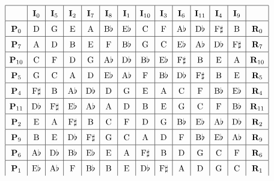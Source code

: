 \documentclass{article}
\begin{document}
\[\def\arraystretch{1.5}
\begin{array}{|c|c|c|c|c|c|c|c|c|c|c|c|c|c|}
\hline
&\mathbf{I}_0&\mathbf{I}_5&\mathbf{I}_2&\mathbf{I}_7&\mathbf{I}_8&\mathbf{I}_1&\mathbf{I}_{10}&\mathbf{I}_3&\mathbf{I}_6&\mathbf{I}_{11}&\mathbf{I}_4&\mathbf{I}_9&\\
\hline
\mathbf{P}_0&\mathrm{D}&\mathrm{G}&\mathrm{E}&\mathrm{A}&\mathrm{B}\flat&\mathrm{E}\flat&\mathrm{C}&\mathrm{F}&\mathrm{A}\flat&\mathrm{D}\flat&\mathrm{F}\sharp&\mathrm{B}&\mathbf{R}_0\\
\hline
\mathbf{P}_7&\mathrm{A}&\mathrm{D}&\mathrm{B}&\mathrm{E}&\mathrm{F}&\mathrm{B}\flat&\mathrm{G}&\mathrm{C}&\mathrm{E}\flat&\mathrm{A}\flat&\mathrm{D}\flat&\mathrm{F}\sharp&\mathbf{R}_7\\
\hline
\mathbf{P}_{10}&\mathrm{C}&\mathrm{F}&\mathrm{D}&\mathrm{G}&\mathrm{A}\flat&\mathrm{D}\flat&\mathrm{B}\flat&\mathrm{E}\flat&\mathrm{F}\sharp&\mathrm{B}&\mathrm{E}&\mathrm{A}&\mathbf{R}_{10}\\
\hline
\mathbf{P}_5&\mathrm{G}&\mathrm{C}&\mathrm{A}&\mathrm{D}&\mathrm{E}\flat&\mathrm{A}\flat&\mathrm{F}&\mathrm{B}\flat&\mathrm{D}\flat&\mathrm{F}\sharp&\mathrm{B}&\mathrm{E}&\mathbf{R}_5\\
\hline
\mathbf{P}_4&\mathrm{F}\sharp&\mathrm{B}&\mathrm{A}\flat&\mathrm{D}\flat&\mathrm{D}&\mathrm{G}&\mathrm{E}&\mathrm{A}&\mathrm{C}&\mathrm{F}&\mathrm{B}\flat&\mathrm{E}\flat&\mathbf{R}_4\\
\hline
\mathbf{P}_{11}&\mathrm{D}\flat&\mathrm{F}\sharp&\mathrm{E}\flat&\mathrm{A}\flat&\mathrm{A}&\mathrm{D}&\mathrm{B}&\mathrm{E}&\mathrm{G}&\mathrm{C}&\mathrm{F}&\mathrm{B}\flat&\mathbf{R}_{11}\\
\hline
\mathbf{P}_2&\mathrm{E}&\mathrm{A}&\mathrm{F}\sharp&\mathrm{B}&\mathrm{C}&\mathrm{F}&\mathrm{D}&\mathrm{G}&\mathrm{B}\flat&\mathrm{E}\flat&\mathrm{A}\flat&\mathrm{D}\flat&\mathbf{R}_2\\
\hline
\mathbf{P}_9&\mathrm{B}&\mathrm{E}&\mathrm{D}\flat&\mathrm{F}\sharp&\mathrm{G}&\mathrm{C}&\mathrm{A}&\mathrm{D}&\mathrm{F}&\mathrm{B}\flat&\mathrm{E}\flat&\mathrm{A}\flat&\mathbf{R}_9\\
\hline
\mathbf{P}_6&\mathrm{A}\flat&\mathrm{D}\flat&\mathrm{B}\flat&\mathrm{E}\flat&\mathrm{E}&\mathrm{A}&\mathrm{F}\sharp&\mathrm{B}&\mathrm{D}&\mathrm{G}&\mathrm{C}&\mathrm{F}&\mathbf{R}_6\\
\hline
\mathbf{P}_1&\mathrm{E}\flat&\mathrm{A}\flat&\mathrm{F}&\mathrm{B}\flat&\mathrm{B}&\mathrm{E}&\mathrm{D}\flat&\mathrm{F}\sharp&\mathrm{A}&\mathrm{D}&\mathrm{G}&\mathrm{C}&\mathbf{R}_1\\

\end{array}\]
\end{document}
